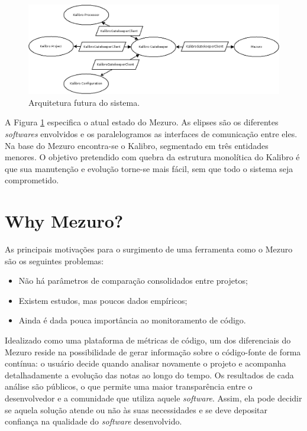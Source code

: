 \documentclass{llncs}
\begin{document}
\begin{figure}[H]
  \centering
    \includegraphics[width=\textwidth]{images/mezuro-architecture-predicted.png}
  \caption{Arquitetura futura do sistema.}
  \label{fig:architecture-2}
\end{figure}

A Figura \ref{fig:architecture-2} especifica o atual estado do Mezuro. As
elipses são os diferentes \textit{softwares} envolvidos e os paralelogramos as
interfaces de comunicação entre eles. Na base do Mezuro encontra-se o Kalibro,
segmentado em três entidades menores. O objetivo pretendido com quebra da
estrutura monolítica do Kalibro é que sua manutenção e evolução torne-se mais
fácil, sem que todo o sistema seja comprometido.


\section{Why Mezuro?} \label{subsec:motivacao}

As principais motivações para o surgimento de uma ferramenta como o Mezuro são
os seguintes problemas:

\begin{itemize}
    \item Não há parâmetros de comparação consolidados entre projetos;
    \item Existem estudos, mas poucos dados empíricos;
    \item Ainda é dada pouca importância ao monitoramento de código.
\end{itemize}

Idealizado como uma plataforma de métricas de código, um dos diferenciais do
Mezuro reside na possibilidade de gerar informação sobre o código-fonte de
forma contínua: o usuário decide quando analisar novamente o projeto e
acompanha detalhadamente a evolução das notas ao longo do tempo. Os resultados
de cada análise são públicos, o que permite uma maior transparência entre o
desenvolvedor e a comunidade que utiliza aquele \textit{software}. Assim, ela
pode decidir se aquela solução atende ou não às suas necessidades e se deve
depositar confiança na qualidade do \textit{software} desenvolvido.
\end{document}

